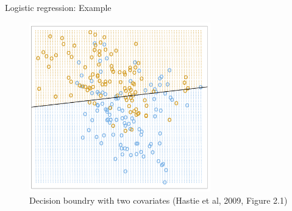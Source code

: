 \documentclass[10pt,handout]{beamer}
\begin{document}
\begin{frame}{Logistic regression: Example}


\begin{figure}[h]
\caption{Decision boundry with two covariates (Hastie et al, 2009, Figure 2.1) }
\centering
\includegraphics[width=0.7\textwidth]{figs/decision_fig_2_1.png}
\end{figure}

\end{frame}
\end{document}
